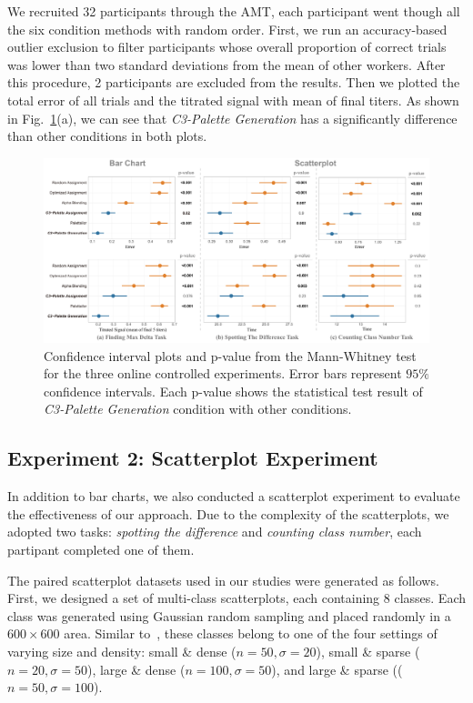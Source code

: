 We recruited 32 participants through the AMT, each participant went though all the six condition methods with random order. First, we run an accuracy-based outlier exclusion to filter participants whose overall proportion of correct trials was lower than two standard deviations from the mean of other workers. After this procedure, 2 participants are excluded from the results. Then we plotted the total error of all trials and the titrated signal with mean of final titers. As shown in Fig.~\ref{fig:userResults}(a), we can see that \emph{C3-Palette Generation} has a significantly difference than other conditions in both plots. 

\begin{figure}[t]
\centering
\includegraphics[width=1\linewidth]{figures/user-result-formal.pdf}
\caption{Confidence interval plots and p-value from the Mann-Whitney test for the three online controlled experiments. Error bars represent $95\%$ confidence intervals. Each p-value shows the statistical test result of \emph{C3-Palette Generation} condition with other conditions.}
\vspace*{-3mm}
\label{fig:userResults}
\end{figure}

\subsection{Experiment 2: Scatterplot Experiment}
\label{subsec:scatterplotExp}
In addition to bar charts, we also conducted a scatterplot experiment to evaluate the effectiveness of our approach. Due to the complexity of the scatterplots, we adopted two tasks: \emph{spotting the difference} and \emph{counting class number}, each partipant completed one of them.

\vspace{.3em}
The paired scatterplot datasets used in our studies were generated as follows.
First, we designed a set of multi-class scatterplots, each containing $8$ classes. Each class was generated using Gaussian random sampling and placed randomly in a $600 \times 600$ area.
Similar to~\cite{Lu21}, these classes belong to one of the four settings of varying size and density: small \& dense ($n=50, \sigma=20$), small \& sparse ($n=20, \sigma=50$),  large \& dense ($n=100, \sigma=50$), and large \& sparse (($n=50, \sigma=100$).


